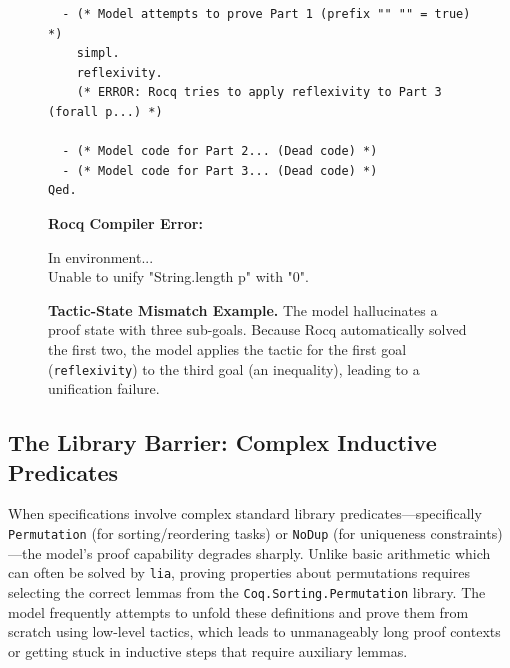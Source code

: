 \begin{figure}[t!]
\begin{tcolorbox}
\begin{tcolorbox}[
        colback=white,
        colframe=white,
        frame hidden,
        boxrule=0pt,
        sharp corners,
        top=3pt, bottom=3pt, left=3pt, right=3pt
    ]
\begin{lstlisting}
  - (* Model attempts to prove Part 1 (prefix "" "" = true) *)
    simpl.
    reflexivity. 
    (* ERROR: Rocq tries to apply reflexivity to Part 3 (forall p...) *)
    
  - (* Model code for Part 2... (Dead code) *)
  - (* Model code for Part 3... (Dead code) *)
Qed.
    \end{lstlisting}
    \end{tcolorbox}

    \vspace{0.2cm}
    
    \textbf{Rocq Compiler Error:}
    \vspace{2pt}
    \begin{tcolorbox}[
        colback=red!5!white,
        colframe=red!75!black,
        left=2pt, right=2pt, top=2pt, bottom=2pt,
        arc=0mm, boxrule=0.5pt,
        title=Compiler Output,
        fonttitle=\bfseries\scriptsize,
        coltitle=white
    ]
    \footnotesize\ttfamily\color{red!40!black}
        In environment...\\
    Unable to unify "String.length p" with "0".
    \end{tcolorbox}
    \end{tcolorbox}
    
    \caption{\textbf{Tactic-State Mismatch Example.} The model hallucinates a proof state with three sub-goals. Because Rocq automatically solved the first two, the model applies the tactic for the first goal (\texttt{reflexivity}) to the third goal (an inequality), leading to a unification failure.}
    \label{fig:phantom_goal_failure}
\end{figure}

\subsection{The Library Barrier: Complex Inductive Predicates}
When specifications involve complex standard library predicates—specifically \texttt{Permutation} (for sorting/reordering tasks) or \texttt{NoDup} (for uniqueness constraints)—the model's proof capability degrades sharply. 
Unlike basic arithmetic which can often be solved by \texttt{lia}, proving properties about permutations requires selecting the correct lemmas from the \texttt{Coq.Sorting.Permutation} library. The model frequently attempts to unfold these definitions and prove them from scratch using low-level tactics, which leads to unmanageably long proof contexts or getting stuck in inductive steps that require auxiliary lemmas.

